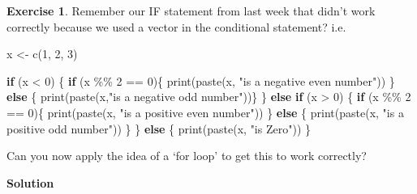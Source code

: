 \documentclass[
]{book}
\newenvironment{Shaded}{\begin{snugshade}}{\end{snugshade}}
\newcommand{\ControlFlowTok}[1]{\textcolor[rgb]{0.13,0.29,0.53}{\textbf{#1}}}
\newcommand{\DecValTok}[1]{\textcolor[rgb]{0.00,0.00,0.81}{#1}}
\newcommand{\FunctionTok}[1]{\textcolor[rgb]{0.00,0.00,0.00}{#1}}
\newcommand{\NormalTok}[1]{#1}
\newcommand{\OtherTok}[1]{\textcolor[rgb]{0.56,0.35,0.01}{#1}}
\newcommand{\SpecialCharTok}[1]{\textcolor[rgb]{0.00,0.00,0.00}{#1}}
\newcommand{\StringTok}[1]{\textcolor[rgb]{0.31,0.60,0.02}{#1}}
\theoremstyle{definition}
\theoremstyle{definition}
\theoremstyle{definition}
\newtheorem{exercise}{Exercise}[chapter]
\theoremstyle{definition}
\theoremstyle{remark}
\begin{document}
\begin{exercise}
Remember our IF statement from last week that didn't work correctly because we used a vector in the conditional statement? i.e.

\begin{Shaded}
\begin{Highlighting}[]
\NormalTok{x }\OtherTok{\textless{}{-}} \FunctionTok{c}\NormalTok{(}\DecValTok{1}\NormalTok{, }\DecValTok{2}\NormalTok{, }\DecValTok{3}\NormalTok{)}

\ControlFlowTok{if}\NormalTok{ (x }\SpecialCharTok{\textless{}} \DecValTok{0}\NormalTok{) \{}
  \ControlFlowTok{if}\NormalTok{ (x }\SpecialCharTok{\%\%} \DecValTok{2} \SpecialCharTok{==} \DecValTok{0}\NormalTok{)\{}
    \FunctionTok{print}\NormalTok{(}\FunctionTok{paste}\NormalTok{(x, }\StringTok{"is a negative even number"}\NormalTok{))}
\NormalTok{  \} }\ControlFlowTok{else}\NormalTok{ \{ }
    \FunctionTok{print}\NormalTok{(}\FunctionTok{paste}\NormalTok{(x,}\StringTok{"is a negative odd number"}\NormalTok{))\}}
\NormalTok{\} }\ControlFlowTok{else} \ControlFlowTok{if}\NormalTok{ (x }\SpecialCharTok{\textgreater{}} \DecValTok{0}\NormalTok{) \{}
  \ControlFlowTok{if}\NormalTok{ (x }\SpecialCharTok{\%\%} \DecValTok{2} \SpecialCharTok{==} \DecValTok{0}\NormalTok{)\{}
    \FunctionTok{print}\NormalTok{(}\FunctionTok{paste}\NormalTok{(x, }\StringTok{"is a positive even number"}\NormalTok{))}
\NormalTok{  \} }\ControlFlowTok{else}\NormalTok{ \{}
    \FunctionTok{print}\NormalTok{(}\FunctionTok{paste}\NormalTok{(x, }\StringTok{"is a positive odd number"}\NormalTok{))}
\NormalTok{  \}}
\NormalTok{\} }\ControlFlowTok{else}\NormalTok{ \{}
  \FunctionTok{print}\NormalTok{(}\FunctionTok{paste}\NormalTok{(x, }\StringTok{"is Zero"}\NormalTok{))}
\NormalTok{\}}
\end{Highlighting}
\end{Shaded}

Can you now apply the idea of a `for loop' to get this to work correctly?
\end{exercise}

\textbf{Solution}
\end{document}
